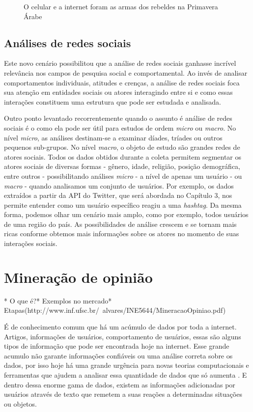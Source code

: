 \begin{figure}[ht]
	
	\centering{}
	\caption{O celular e a internet foram as armas dos rebeldes na Primavera Árabe}
	\label{uni}
\end{figure}

\subsection{Análises de redes sociais}
Este novo cenário possibilitou que a análise de redes sociais ganhasse incrível relevância nos campos de pesquisa social e comportamental\cite{wasserman1994advances}. Ao invés de analisar comportamentos individuais, atitudes e crenças, a análise de redes sociais foca sua atenção em entidades sociais ou atores interagindo entre si e como essas interações constituem uma estrutura que pode ser estudada e analisada.

Outro ponto levantado recorrentemente quando o assunto é análise de redes sociais é o como ela pode ser útil para estudos de ordem \textit{micro} ou \textit{macro}. No nível \textit{micro}, as análises destinam-se a examinar díades, tríades ou outros pequenos sub-grupos. No nível \textit{macro}, o objeto de estudo são grandes redes de atores sociais.
Todos os dados obtidos durante a coleta permitem segmentar os atores sociais de diversas formas - gênero, idade, religião, posição demográfica, entre outros - possibilitando análises \textit{micro} - a nível de apenas um usuário - ou \textit{macro} - quando analisamos um conjunto de usuários. Por exemplo, os dados extraídos a partir da API do Twitter, que será abordada no Capítulo 3, nos permite entender como um usuário específico reagiu a uma \textit{hashtag}. Da mesma forma, podemos olhar um cenário mais amplo, como por exemplo, todos usuários de uma região do país. As possibilidades de análise crescem e se tornam mais ricas conforme obtemos mais informações sobre os atores no momento de suas interações sociais.

\section{Mineração de opinião}\label{sec:mineracao_dados}

* O que é?* Exemplos no mercado* Etapas(http://www.inf.ufsc.br/~alvares/INE5644/MineracaoOpiniao.pdf)

É de conhecimento comum que há um acúmulo de dados por toda a internet. Artigos, informações de usuários, comportamento de usuários, essas são alguns tipos de informação que pode ser encontrada hoje na internet. Esse grande acumulo não garante informações confiáveis ou uma análise correta sobre os dados, por isso hoje há uma grande urgência para novas teorias computacionais e ferramentas que ajudem a analisar essa quantidade de dados que só aumenta \cite{fayyad1996data}. E dentro dessa enorme gama de dados, existem as informações adicionadas por usuários através de texto que remetem a suas reações a determinadas situações ou objetos.

